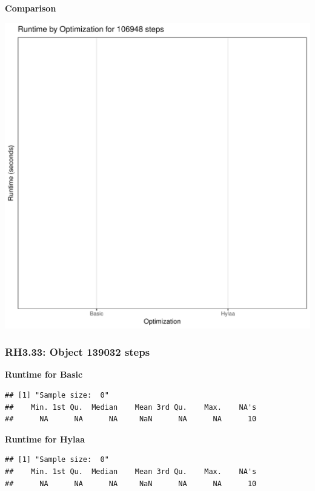 \documentclass{article}\usepackage[]{graphicx}\usepackage[]{color}
\makeatletter
\def\maxwidth{ %
  \ifdim\Gin@nat@width>\linewidth
    \linewidth
  \else
    \Gin@nat@width
  \fi
}
\newenvironment{kframe}{%
 \def\at@end@of@kframe{}%
 \ifinner\ifhmode%
  \def\at@end@of@kframe{\end{minipage}}%
  \begin{minipage}{\columnwidth}%
 \fi\fi%
 \def\FrameCommand##1{\hskip\@totalleftmargin \hskip-\fboxsep
 \colorbox{shadecolor}{##1}\hskip-\fboxsep
     \hskip-\linewidth \hskip-\@totalleftmargin \hskip\columnwidth}%
 \MakeFramed {\advance\hsize-\width
   \@totalleftmargin\z@ \linewidth\hsize
   \@setminipage}}%
 {\par\unskip\endMakeFramed%
 \at@end@of@kframe}
\newenvironment{knitrout}{}{} %
\makeatother
\begin{document}
 \textbf{Comparison}
  
\begin{knitrout}
\color{fgcolor}
\includegraphics[width=\maxwidth]{figure/RH3_steps106948-1} 

\end{knitrout}


\subsubsection{RH3.33: Object 139032 steps}

 \textbf{Runtime for Basic}
\begin{knitrout}
\color{fgcolor}\begin{kframe}
\begin{verbatim}
## [1] "Sample size:  0"
##    Min. 1st Qu.  Median    Mean 3rd Qu.    Max.    NA's 
##      NA      NA      NA     NaN      NA      NA      10
\end{verbatim}
\end{kframe}
\end{knitrout}
 \textbf{Runtime for Hylaa}
\begin{knitrout}
\color{fgcolor}\begin{kframe}
\begin{verbatim}
## [1] "Sample size:  0"
##    Min. 1st Qu.  Median    Mean 3rd Qu.    Max.    NA's 
##      NA      NA      NA     NaN      NA      NA      10
\end{verbatim}
\end{kframe}
\end{knitrout}
  
\end{document}
